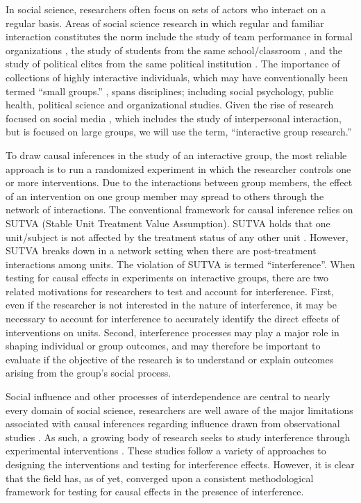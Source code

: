 \documentclass[12pt]{article}
\begin{document}
In social science, researchers often focus on sets of actors who interact on a regular basis. Areas of social science research in which regular and familiar interaction constitutes the norm include the study of team performance in formal organizations \citep[e.g., ][]{anderson1992}, the study of students from the same school/classroom \citep[e.g., ][]{sallis1997}, and the study of political elites from the same political institution \citep[e.g.,][]{bratton1999}. The importance of collections of highly interactive individuals, which may have conventionally been termed ``small groups.'' \citep{levine1990}, spans disciplines; including social psychology, public health, political science and organizational studies. Given the rise of research focused on social media \citep{agichtein2008}, which includes the study of interpersonal interaction, but is focused on large groups, we will use the term, ``interactive group research.'' 

To draw causal inferences in the study of an interactive group, the most reliable approach is to run a randomized experiment in which the researcher controls one or more interventions. Due to the interactions between group members, the effect of an intervention on one group member may spread to others through the network of interactions. The conventional framework for causal inference relies on SUTVA (Stable Unit Treatment Value Assumption). SUTVA holds that one unit/subject is not affected by the treatment status of any other unit \citep{sekhon2008}. However, SUTVA breaks down in a network setting \citep{galea2010} when there are post-treatment interactions among units. The violation of SUTVA is termed ``interference''.  When testing for causal effects in experiments on interactive groups, there are two related motivations for researchers to test and account for interference. First, even if the researcher is not interested in the nature of interference, it may be necessary to account for interference to accurately identify the direct effects of interventions on units. Second, interference processes may play a major role in shaping individual or group outcomes, and may therefore be important to evaluate if the objective of the research is to understand or explain outcomes arising from the group's social process. 

Social influence and other processes of interdependence are central to nearly every domain of social science, researchers are well aware of the major limitations associated with causal inferences regarding influence drawn from observational studies \citep{Shalizi:2011}. As such, a growing body of research seeks to study interference through experimental interventions \citep[e.g., ][]{gerber2008,paluck2011,Bond:2012,muchnik2013,aral2014,bapna2015,Ben-AaronPAR}. These studies follow a variety of approaches to designing the interventions and testing for interference effects. However, it is clear that the field has, as of yet, converged upon a consistent methodological framework for testing for causal effects in the presence of interference.  
\end{document}
